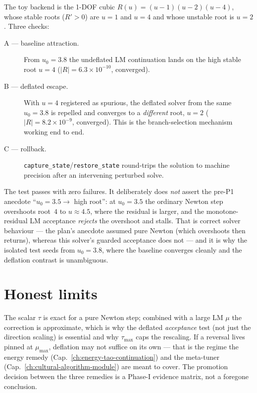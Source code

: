 The toy backend is the 1-DOF cubic \(R(u)=(u-1)(u-2)(u-4)\), whose stable
roots (\(R'>0\)) are \(u=1\) and \(u=4\) and whose unstable root is
\(u=2\). Three checks:
%
\begin{description}
  \item[A --- baseline attraction.] From \(u_0=3.8\) the undeflated LM
        continuation lands on the high stable root \(u=4\)
        (\(|R|=6.3\times10^{-10}\), converged).
  \item[B --- deflated escape.] With \(u=4\) registered as spurious, the
        deflated solver from the same \(u_0=3.8\) is repelled and
        converges to a \emph{different} root, \(u=2\)
        (\(|R|=8.2\times10^{-9}\), converged). This is the branch-selection
        mechanism working end to end.
  \item[C --- rollback.] \texttt{capture\_state}/\texttt{restore\_state}
        round-trips the solution to machine precision after an
        intervening perturbed solve.
\end{description}
%
The test passes with zero failures. It deliberately does \emph{not}
assert the pre-P1 anecdote ``\(u_0=3.5\to\) high root'': at \(u_0=3.5\)
the ordinary Newton step overshoots root~\(4\) to \(u\approx4.5\), where
the residual is larger, and the monotone-residual LM acceptance
\emph{rejects} the overshoot and stalls. That is correct solver
behaviour --- the plan's anecdote assumed pure Newton (which overshoots
then returns), whereas this solver's guarded acceptance does not --- and
it is why the isolated test seeds from \(u_0=3.8\), where the baseline
converges cleanly and the deflation contrast is unambiguous.

\section{Honest limits}

The scalar \(\tau\) is exact for a pure Newton step; combined with a
large LM \(\mu\) the correction is approximate, which is why the deflated
\emph{acceptance} test (not just the direction scaling) is essential and
why \(\tau_{\max}\) caps the rescaling. If a reversal lives pinned at
\(\mu_{\max}\), deflation may not suffice on its own --- that is the
regime the energy remedy (Cap.~\ref{ch:energy-tao-continuation}) and the
meta-tuner (Cap.~\ref{ch:cultural-algorithm-module}) are meant to cover.
The promotion decision between the three remedies is a Phase-I evidence
matrix, not a foregone conclusion.
